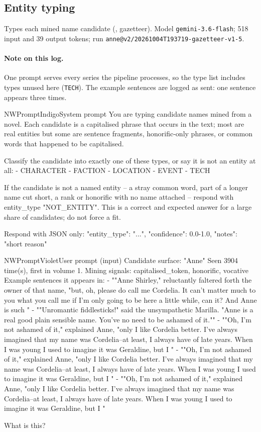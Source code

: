 \subsection*{Entity typing}
Types each mined name candidate (\sys, gazetteer). Model \texttt{gemini-3.6-flash}; 518 input and 39 output tokens; run \nolinkurl{anne@v2/20261004T193719-gazetteer-v1-5}.

\paragraph{Note on this log.} One prompt serves every series the pipeline processes, so the
type list includes types unused here (\texttt{TECH}). The example sentences are logged as
sent: one sentence appears three times.

\begin{nwprompt}{NWPromptIndigo}{System prompt}
You are typing candidate names mined from a novel. Each candidate is a capitalised phrase that occurs in the text; most are real entities but some are sentence fragments, honorific-only phrases, or common words that happened to be capitalised.

Classify the candidate into exactly one of these types, or say it is not an entity at all:
- CHARACTER
- FACTION
- LOCATION
- EVENT
- TECH

If the candidate is not a named entity -- a stray common word, part of a longer name cut short, a rank or honorific with no name attached -- respond with entity_type "NOT_ENTITY". This is a correct and expected answer for a large share of candidates; do not force a fit.

Respond with JSON only: {"entity_type": "...", "confidence": 0.0-1.0, "notes": "short reason"}
\end{nwprompt}

\begin{nwprompt}{NWPromptViolet}{User prompt (input)}
Candidate surface: "Anne"
Seen 3904 time(s), first in volume 1.
Mining signals: capitalised_token, honorific, vocative
Example sentences it appears in:
- ""Anne Shirley," reluctantly faltered forth the owner of that name, "but, oh, please do call me Cordelia. It can't matter much to you what you call me if I'm only going to be here a little while, can it? And Anne is such "
- ""Unromantic fiddlesticks!" said the unsympathetic Marilla. "Anne is a real good plain sensible name. You've no need to be ashamed of it.""
- ""Oh, I'm not ashamed of it," explained Anne, "only I like Cordelia better. I've always imagined that my name was Cordelia--at least, I always have of late years. When I was young I used to imagine it was Geraldine, but I "
- ""Oh, I'm not ashamed of it," explained Anne, "only I like Cordelia better. I've always imagined that my name was Cordelia--at least, I always have of late years. When I was young I used to imagine it was Geraldine, but I "
- ""Oh, I'm not ashamed of it," explained Anne, "only I like Cordelia better. I've always imagined that my name was Cordelia--at least, I always have of late years. When I was young I used to imagine it was Geraldine, but I "

What is this?
\end{nwprompt}

